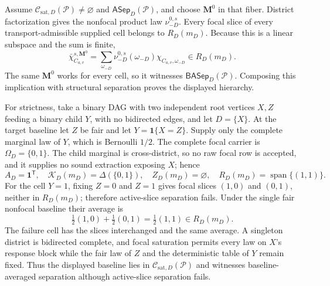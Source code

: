 Assume \(\mathcal C_{\mathrm{sat},D}(\mathcal P)\ne\varnothing\) and \(\mathsf{ASep}_D(\mathcal P)\), and choose \(\mathbf M^0\) in that fiber.  District factorization gives the nonfocal product law \(\nu_{-D}^{0,s}\).  Every focal slice of every transport-admissible supplied cell belongs to \(R_D(m_D)\).  Because this is a linear subspace and the sum is finite,
\[
\bar\chi_{C_{a,v}}^{s,\mathbf M^0}
=\sum_{\omega_{-D}}\nu_{-D}^{0,s}(\omega_{-D})
\chi_{C_{a,v},\omega_{-D}}
\in R_D(m_D).
\]
The same \(\mathbf M^0\) works for every cell, so it witnesses \(\mathsf{BASep}_D(\mathcal P)\).  Composing this implication with structural separation proves the displayed hierarchy.

For strictness, take a binary DAG with two independent root vertices \(X,Z\) feeding a binary child \(Y\), with no bidirected edges, and let \(D=\{X\}\).  At the target baseline let \(Z\) be fair and let \(Y=\mathbf 1\{X=Z\}\).  Supply only the complete marginal law of \(Y\), which is Bernoulli \(1/2\).  The complete focal carrier is \(\Omega_D=\{0,1\}\).  The child marginal is cross-district, so no raw focal row is accepted, and it supplies no sound extraction exposing \(X\); hence
\[
A_D=\mathbf 1^{\mathsf T},\quad
\mathcal K_D(m_D)=\Delta(\{0,1\}),\quad
Z_D(m_D)=\varnothing,\quad
R_D(m_D)=\operatorname{span}\{(1,1)\}.
\]
For the cell \(Y=1\), fixing \(Z=0\) and \(Z=1\) gives focal slices \((1,0)\) and \((0,1)\), neither in \(R_D(m_D)\); therefore active-slice separation fails.  Under the single fair nonfocal baseline their average is
\[
\tfrac12(1,0)+\tfrac12(0,1)=\tfrac12(1,1)\in R_D(m_D).
\]
The failure cell has the slices interchanged and the same average.  A singleton district is bidirected complete, and focal saturation permits every law on \(X\)'s response block while the fair law of \(Z\) and the deterministic table of \(Y\) remain fixed.  Thus the displayed baseline lies in \(\mathcal C_{\mathrm{sat},D}(\mathcal P)\) and witnesses baseline-averaged separation although active-slice separation fails.